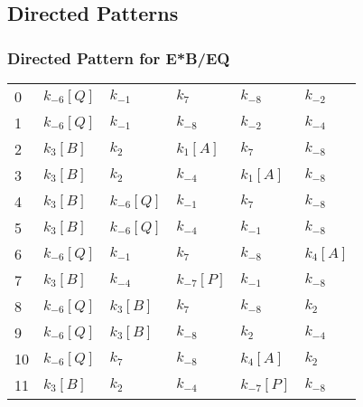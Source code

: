\documentclass{article}%
\begin{document}
%
\subsection{Directed Patterns}%
\label{subsec:Directed Patterns}%
\subsubsection{Directed Pattern for E*B/EQ}%
\label{ssubsec:Directed Pattern for E*B/EQ}%
\begin{tabular}{llllll}
\toprule
0  &  $k_{-6}$$[Q]$ &       $k_{-1}$ &        $k_{7}$ &       $k_{-8}$ &      $k_{-2}$ \\
1  &  $k_{-6}$$[Q]$ &       $k_{-1}$ &       $k_{-8}$ &       $k_{-2}$ &      $k_{-4}$ \\
2  &   $k_{3}$$[B]$ &        $k_{2}$ &   $k_{1}$$[A]$ &        $k_{7}$ &      $k_{-8}$ \\
3  &   $k_{3}$$[B]$ &        $k_{2}$ &       $k_{-4}$ &   $k_{1}$$[A]$ &      $k_{-8}$ \\
4  &   $k_{3}$$[B]$ &  $k_{-6}$$[Q]$ &       $k_{-1}$ &        $k_{7}$ &      $k_{-8}$ \\
5  &   $k_{3}$$[B]$ &  $k_{-6}$$[Q]$ &       $k_{-4}$ &       $k_{-1}$ &      $k_{-8}$ \\
6  &  $k_{-6}$$[Q]$ &       $k_{-1}$ &        $k_{7}$ &       $k_{-8}$ &  $k_{4}$$[A]$ \\
7  &   $k_{3}$$[B]$ &       $k_{-4}$ &  $k_{-7}$$[P]$ &       $k_{-1}$ &      $k_{-8}$ \\
8  &  $k_{-6}$$[Q]$ &   $k_{3}$$[B]$ &        $k_{7}$ &       $k_{-8}$ &       $k_{2}$ \\
9  &  $k_{-6}$$[Q]$ &   $k_{3}$$[B]$ &       $k_{-8}$ &        $k_{2}$ &      $k_{-4}$ \\
10 &  $k_{-6}$$[Q]$ &        $k_{7}$ &       $k_{-8}$ &   $k_{4}$$[A]$ &       $k_{2}$ \\
11 &   $k_{3}$$[B]$ &        $k_{2}$ &       $k_{-4}$ &  $k_{-7}$$[P]$ &      $k_{-8}$ \\
\bottomrule
\end{tabular}

%
\end{document}
